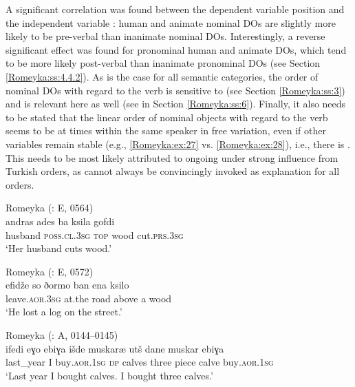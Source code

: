 \documentclass[output=paper,colorlinks,citecolor=brown]{langscibook}
\begin{document}
A significant correlation was found between the dependent variable position and the independent variable : human and animate nominal DOs are slightly more likely to be pre-verbal than inanimate nominal DOs. Interestingly, a reverse significant effect was found for pronominal human and animate DOs, which tend to be more likely post-verbal than inanimate pronominal DOs (see Section \ref{Romeyka:ss:4.4.2}). As is the case for all semantic categories, the order of nominal DOs with regard to the verb is sensitive to  (see Section \ref{Romeyka:ss:3}) and  is relevant here as well (see  in Section \ref{Romeyka:ss:6}). Finally, it also needs to be stated that the linear order of nominal objects with regard to the verb seems to be at times within the same speaker in free variation, even if other variables remain stable (e.g., \ref{Romeyka:ex:27} vs. \ref{Romeyka:ex:28}), i.e., there is . This needs to be most likely attributed to ongoing  under strong influence from Turkish  orders, as  cannot always be convincingly invoked as explanation for all  orders.

\ea\label{Romeyka:ex:24}
Romeyka (\citealt{schreiber2021pontic}: E, 0564) \\
\gll andras ades ba ksila gofdi \\
husband \textsc{poss.cl.3sg} \textsc{top} wood cut\textsc{.prs.3sg} \\
\glt 	`Her husband cuts wood.'  \\
\z

\newpage

\ea\label{Romeyka:ex:25}
Romeyka (\citealt{schreiber2021pontic}: E, 0572) \\
\gll efidže so ðormo ban ena ksilo \\
leave\textsc{.aor.3sg} at.the road above a wood \\
\glt `He lost a log on the street.'  \\
\z

\ea\label{Romeyka:ex:26}	
Romeyka (\citealt{schreiber2021pontic}: A, 0144--0145) \\
\gll ifedi eɣo ebiɣa išde muskaræ utš dane muskar ebiɣa \\
last\_year I buy\textsc{.aor.1sg} \textsc{dp} calves three piece calve buy\textsc{.aor.1sg} \\
\glt `Last year I bought calves. I bought three calves.' 
\z
\end{document}
